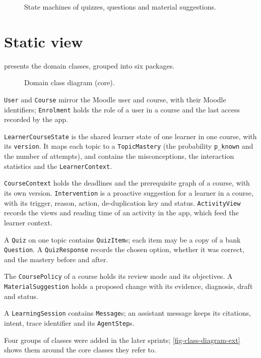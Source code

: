 \begin{figure}[htbp]
  \centering
  \caption{State machines of quizzes, questions and material suggestions.}
  \label{fig-states}
\end{figure}

\section{Static view}
\label{sec-d-static}

 presents the domain classes, grouped into six
packages.

\begin{figure}[htbp]
  \centering
  \caption{Domain class diagram (core).}
  \label{fig-class-diagram}
\end{figure}

\begin{description}[style=nextline, leftmargin=0.6cm]
  \item[Identity] \texttt{User} and \texttt{Course} mirror the Moodle user
    and course, with their Moodle identifiers; \texttt{Enrolment} holds
    the role of a user in a course and the last access recorded by the
    app.
  \item[Learner state] \texttt{LearnerCourseState} is the shared learner
    state of one learner in one course, with its \texttt{version}. It
    maps each topic to a \texttt{TopicMastery} (the probability
    \texttt{p\_known} and the number of attempts), and contains the
    misconceptions, the interaction statistics and the
    \texttt{LearnerContext}.
  \item[Context] \texttt{CourseContext} holds the deadlines and the
    prerequisite graph of a course, with its own version.
    \texttt{Intervention} is a proactive suggestion for a learner in a
    course, with its trigger, reason, action, de-duplication key and
    status. \texttt{ActivityView} records the views and reading time of an
    activity in the app, which feed the learner context.
  \item[Assessment] A \texttt{Quiz} on one topic contains
    \texttt{QuizItem}s; each item may be a copy of a bank
    \texttt{Question}. A \texttt{QuizResponse} records the chosen option,
    whether it was correct, and the mastery before and after.
  \item[Teaching] The \texttt{CoursePolicy} of a course holds its review
    mode and its objectives. A \texttt{MaterialSuggestion} holds a
    proposed change with its evidence, diagnosis, draft and status.
  \item[Chat and tracing] A \texttt{LearningSession} contains
    \texttt{Message}s; an assistant message keeps its citations, intent,
    trace identifier and its \texttt{AgentStep}s.
\end{description}
Four groups of classes were added in the later sprints; \cref{fig-class-diagram-ext}
shows them around the core classes they refer to.

